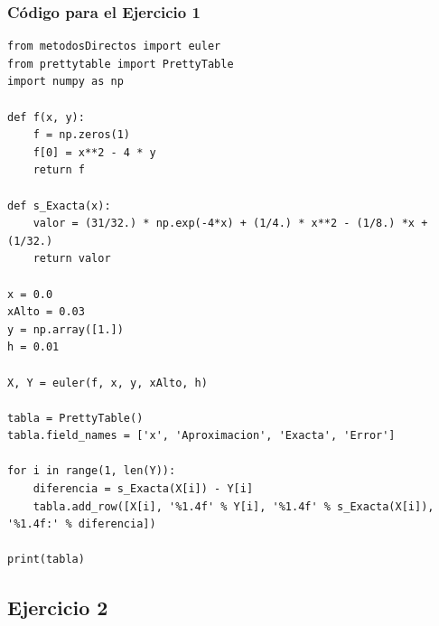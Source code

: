 \documentclass[12pt]{beamer}
\begin{document}
\begin{frame}
\frametitle{Código para el Ejercicio 1}
\begin{lstlisting}[caption=Código para resolver la EDO1]
from metodosDirectos import euler
from prettytable import PrettyTable
import numpy as np

def f(x, y):
	f = np.zeros(1)
	f[0] = x**2 - 4 * y
	return f

def s_Exacta(x):
	valor = (31/32.) * np.exp(-4*x) + (1/4.) * x**2 - (1/8.) *x + (1/32.)
	return valor

x = 0.0
xAlto = 0.03
y = np.array([1.])
h = 0.01

X, Y = euler(f, x, y, xAlto, h)

tabla = PrettyTable()
tabla.field_names = ['x', 'Aproximacion', 'Exacta', 'Error']

for i in range(1, len(Y)):
	diferencia = s_Exacta(X[i]) - Y[i]
	tabla.add_row([X[i], '%1.4f' % Y[i], '%1.4f' % s_Exacta(X[i]), '%1.4f:' % diferencia])
	
print(tabla)
\end{lstlisting}
\end{frame}

\subsection{Ejercicio 2}
\end{document}
